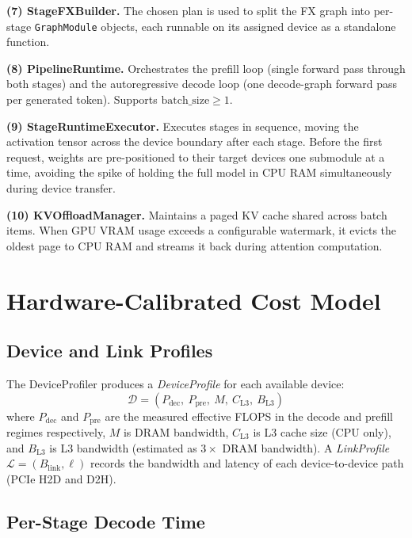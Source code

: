 \documentclass[lettersize,journal]{IEEEtran}
\begin{document}
\textbf{(7) StageFXBuilder.} The chosen plan is used to split the FX graph
into per-stage \texttt{GraphModule} objects, each runnable on its assigned
device as a standalone function.

\textbf{(8) PipelineRuntime.} Orchestrates the prefill loop (single forward
pass through both stages) and the autoregressive decode loop (one
decode-graph forward pass per generated token). Supports $\text{batch\_size} \geq 1$.

\textbf{(9) StageRuntimeExecutor.} Executes stages in sequence, moving the
activation tensor across the device boundary after each stage. Before the
first request, weights are pre-positioned to their target devices one
submodule at a time, avoiding the spike of holding the full model in CPU RAM
simultaneously during device transfer.

\textbf{(10) KVOffloadManager.} Maintains a paged KV cache shared across
batch items. When GPU VRAM usage exceeds a configurable watermark, it evicts
the oldest page to CPU RAM and streams it back during attention computation.

\section{Hardware-Calibrated Cost Model}
\label{sec:costmodel}

\subsection{Device and Link Profiles}

The DeviceProfiler produces a \emph{DeviceProfile} for each available device:
\begin{equation}
  \mathcal{D} = (P_\text{dec},\ P_\text{pre},\ M,\ C_\text{L3},\ B_\text{L3})
\end{equation}
where $P_\text{dec}$ and $P_\text{pre}$ are the measured effective FLOPS in
the decode and prefill regimes respectively, $M$ is DRAM bandwidth,
$C_\text{L3}$ is L3 cache size (CPU only), and $B_\text{L3}$ is L3 bandwidth
(estimated as $3\times$ DRAM bandwidth). A \emph{LinkProfile}
$\mathcal{L} = (B_\text{link}, \ell)$ records the bandwidth and latency of
each device-to-device path (PCIe H2D and D2H).

\subsection{Per-Stage Decode Time}
\end{document}
